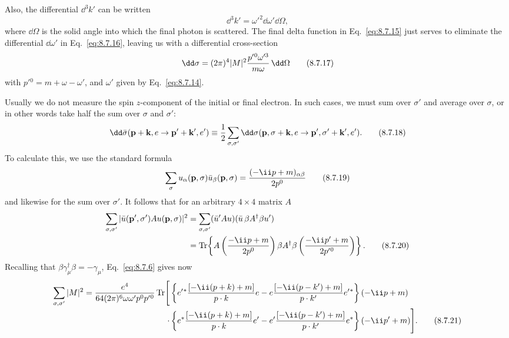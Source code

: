 Also, the differential $\dd^3k'$ can be written
\begin{equation}
\dd^3k'=\omega'^2\dd\omega' \dd\Omega,
\tag{8.7.16}\label{eq:8.7.16}
\end{equation}
where $\dd\Omega$ is the solid angle into which the final photon is scattered.
The final delta function in Eq.~\eqref{eq:8.7.15} just serves to eliminate the
differential $\dd\omega'$ in Eq.~\eqref{eq:8.7.16}, leaving us with a differential
cross-section
\begin{equation}
\dd\sigma=(2\pi)^4|M|^2{p'{}^0\omega'^3\over m\omega}\,\dd\Omega
\tag{8.7.17}\label{eq:8.7.17}
\end{equation}
with $p'{}^0=m+\omega-\omega'$, and $\omega'$ given by Eq.~\eqref{eq:8.7.14}.

Usually we do not measure the spin $z$-component of the initial or final
electron. In such cases, we must sum over $\sigma'$ and average over $\sigma$,
or in other words take half the sum over $\sigma$ and $\sigma'$:
\begin{equation}
\dd\bar\sigma(\mathbf p+\mathbf k,e\to\mathbf p'+\mathbf k',e')
\equiv{1\over2}\sum_{\sigma,\sigma'}\dd\sigma(\mathbf p,\sigma+\mathbf k,e
\to\mathbf p',\sigma'+\mathbf k',e').
\tag{8.7.18}\label{eq:8.7.18}
\end{equation}
To calculate this, we use the standard formula
\begin{equation}
\sum_\sigma u_\alpha(\mathbf p,\sigma)\bar u_\beta(\mathbf p,\sigma)
={(-\ii\sl{p}+m)_{\alpha\beta}\over2p^0}
\tag{8.7.19}\label{eq:8.7.19}
\end{equation}
and likewise for the sum over $\sigma'$. It follows that for an arbitrary
$4\times4$ matrix $A$
\begin{align}
\sum_{\sigma,\sigma'}|\bar u(\mathbf p',\sigma')Au(\mathbf p,\sigma)|^2
&=\sum_{\sigma,\sigma'}(\bar u'A u)(\bar u\,\beta A^\dagger\beta u')
\notag\\
&=\operatorname{Tr}\!\left\{A\left({-\ii\sl{p}+m\over2p^0}\right)
\beta A^\dagger\beta\left({-\ii\sl{p'}+m\over2p'{}^0}\right)\right\}.
\tag{8.7.20}\label{eq:8.7.20}
\end{align}
Recalling that $\beta\gamma_\mu^\dagger\beta=-\gamma_\mu$, Eq.~\eqref{eq:8.7.6}
gives now
\begingroup\small
\begin{align}
\sum_{\sigma,\sigma'}|M|^2
={e^4\over64(2\pi)^6\omega\omega'p^0p'{}^0}
\operatorname{Tr}\Biggl[
&\left\{\sl{e'}{}^*
 {[-\ii(\sl{p}+\sl{k})+m]\over p\cdot k}\sl{e}
-\sl{e}{[-\ii(\sl{p}-\sl{k'})+m]\over p\cdot k'}\sl{e'}{}^*\right\}
(-\ii\sl{p}+m)
\notag\\[-2pt]
\cdot&\left\{\sl{e}^*{[-\ii(\sl{p}+\sl{k})+m]\over p\cdot k}\sl{e'}
-\sl{e'}{[-\ii(\sl{p}-\sl{k'})+m]\over p\cdot k'}\sl{e}^*\right\}
(-\ii\sl{p'}+m)\Biggr].
\tag{8.7.21}\label{eq:8.7.21}
\end{align}
